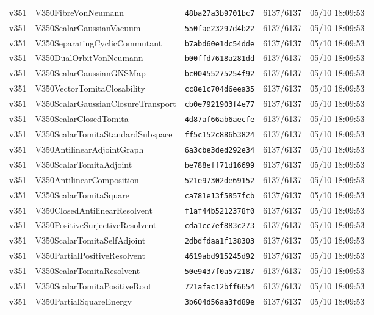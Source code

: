 \documentclass[11pt]{article}
\theoremstyle{definition}\newtheorem{deriv}{Derivação}
\begin{document}
{\begin{longtable}{@{}lllll@{}}
v351 & V350FibreVonNeumann & \texttt{48ba27a3b9701bc7} & 6137/6137 & 05/10 18:09:53 \\
v351 & V350ScalarGaussianVacuum & \texttt{550fae23297d4b22} & 6137/6137 & 05/10 18:09:53 \\
v351 & V350SeparatingCyclicCommutant & \texttt{b7abd60e1dc54dde} & 6137/6137 & 05/10 18:09:53 \\
v351 & V350DualOrbitVonNeumann & \texttt{b00ffd7618a281dd} & 6137/6137 & 05/10 18:09:53 \\
v351 & V350ScalarGaussianGNSMap & \texttt{bc00455275254f92} & 6137/6137 & 05/10 18:09:53 \\
v351 & V350VectorTomitaClosability & \texttt{cc8e1c704d6eea35} & 6137/6137 & 05/10 18:09:53 \\
v351 & V350ScalarGaussianClosureTransport & \texttt{cb0e7921903f4e77} & 6137/6137 & 05/10 18:09:53 \\
v351 & V350ScalarClosedTomita & \texttt{4d87af66ab6aecfe} & 6137/6137 & 05/10 18:09:53 \\
v351 & V350ScalarTomitaStandardSubspace & \texttt{ff5c152c886b3824} & 6137/6137 & 05/10 18:09:53 \\
v351 & V350AntilinearAdjointGraph & \texttt{6a3cbe3ded292e34} & 6137/6137 & 05/10 18:09:53 \\
v351 & V350ScalarTomitaAdjoint & \texttt{be788eff71d16699} & 6137/6137 & 05/10 18:09:53 \\
v351 & V350AntilinearComposition & \texttt{521e97302de69152} & 6137/6137 & 05/10 18:09:53 \\
v351 & V350ScalarTomitaSquare & \texttt{ca781e13f5857fcb} & 6137/6137 & 05/10 18:09:53 \\
v351 & V350ClosedAntilinearResolvent & \texttt{f1af44b5212378f0} & 6137/6137 & 05/10 18:09:53 \\
v351 & V350PositiveSurjectiveResolvent & \texttt{cda1cc7ef883c273} & 6137/6137 & 05/10 18:09:53 \\
v351 & V350ScalarTomitaSelfAdjoint & \texttt{2dbdfdaa1f138303} & 6137/6137 & 05/10 18:09:53 \\
v351 & V350PartialPositiveResolvent & \texttt{4619abd915245d92} & 6137/6137 & 05/10 18:09:53 \\
v351 & V350ScalarTomitaResolvent & \texttt{50e9437f0a572187} & 6137/6137 & 05/10 18:09:53 \\
v351 & V350ScalarTomitaPositiveRoot & \texttt{721afac12bff6654} & 6137/6137 & 05/10 18:09:53 \\
v351 & V350PartialSquareEnergy & \texttt{3b604d56aa3fd89e} & 6137/6137 & 05/10 18:09:53 \\

\end{longtable}}
\end{document}
